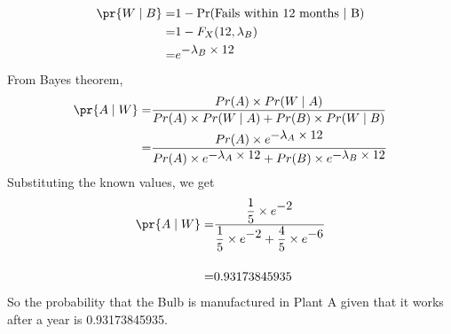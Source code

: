 \begin{align}
    \text{$\pr{W \mid B}$} = & 1 -\notag \text{Pr(Fails within 12 months $\mid$ B)}\\
        = & 1 - F_X(12,\lambda_B)                       \\
        = & {e}^{\displaystyle - \lambda_B \times 12} 
\end{align}
From Bayes theorem,\\
\begin{align}
    \pr{A \mid W} = & \displaystyle{\frac{Pr(A) \times Pr(W \mid A)}{Pr(A) \times Pr(W \mid A) + Pr(B) \times Pr(W \mid B)}}\\
    = & \displaystyle{\frac{Pr(A) \times {e}^{\displaystyle - \lambda_A \times 12}}{Pr(A) \times {e}^{\displaystyle - \lambda_A \times 12} + Pr(B) \times {e}^{\displaystyle - \lambda_B \times 12} }}
\end{align}
Substituting the known values, we get
\begin{align}
    \pr{A \mid W} = &\displaystyle{\frac{\displaystyle{\frac{1}{5}} \times {e}^{\displaystyle - 2}}{\displaystyle{\frac{1}{5}} \times {e}^{\displaystyle - 2} + \displaystyle{\frac{4}{5}} \times {e}^{\displaystyle - 6} }}\\[0.4cm]
    = & 0.93173845935
\end{align}
So the probability that the Bulb is manufactured in Plant A given that it works after a year is 0.93173845935.